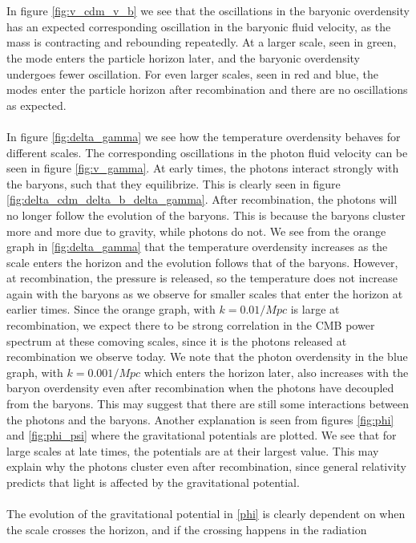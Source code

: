 \documentclass{aa}
\begin{document}
\\ \\
In figure \ref{fig:v_cdm_v_b} we see that the oscillations in the baryonic overdensity has an expected corresponding oscillation in the baryonic fluid velocity, as the mass is contracting and rebounding repeatedly.
At a larger scale, seen in green, the mode enters the particle horizon later, and the baryonic overdensity undergoes fewer oscillation. For even larger scales, seen in 
red and blue, the modes enter the particle horizon after recombination and there are no oscillations as expected.\\
\\
In figure \ref{fig:delta_gamma} we see how the temperature overdensity behaves for different scales. The corresponding oscillations in the photon fluid velocity can be seen in figure \ref{fig:v_gamma}.
At early times, the photons interact strongly with the baryons, such that they equilibrize. This is clearly seen in figure \ref{fig:delta_cdm_delta_b_delta_gamma}. After 
recombination, the photons will no longer follow the evolution of the baryons. This is because the baryons cluster more and more due to gravity, while photons
do not. We see from the orange graph in \ref{fig:delta_gamma} that the temperature overdensity increases as the scale enters
the horizon and the evolution follows that of the baryons. However, at recombination, the pressure is released, so the temperature does not increase again with the baryons
as we observe for smaller scales that enter the horizon at earlier times. Since the orange graph, with $k = 0.01/Mpc$ is large at recombination, we expect there to be strong
correlation in the CMB power spectrum at these comoving scales, since it is the photons released at recombination we observe today. We note that the photon overdensity in the blue graph, with $k = 0.001/Mpc$
which enters the horizon later, also increases with the baryon overdensity even after recombination when the photons have decoupled from the baryons. This may suggest that
there are still some interactions between the photons and the baryons. Another explanation is seen from figures \ref{fig:phi} and \ref{fig:phi_psi} where the gravitational potentials are plotted.
We see that for large scales at late times, the potentials are at their largest value. This may explain why the photons cluster even after recombination, since general relativity predicts that 
light is affected by the gravitational potential.\\
\\
The evolution of the gravitational potential in \ref{phi} is clearly dependent on when the scale crosses the horizon, and if the crossing happens in the radiation 
\end{document}
